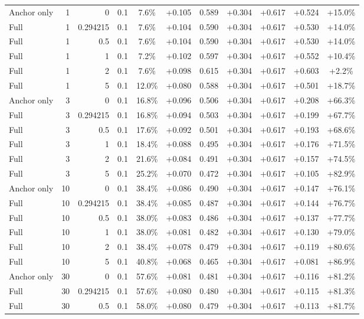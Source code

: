\begin{table}[htbp]
\begin{tabular}{lrrrccccccc}
Anchor only & 1 & 0 & 0.1 & 7.6\% & +0.105 & 0.589 & +0.304 & +0.617 & +0.524 & +15.0\% \\
Full & 1 & 0.294215 & 0.1 & 7.6\% & +0.104 & 0.590 & +0.304 & +0.617 & +0.530 & +14.0\% \\
Full & 1 & 0.5 & 0.1 & 7.6\% & +0.104 & 0.590 & +0.304 & +0.617 & +0.530 & +14.0\% \\
Full & 1 & 1 & 0.1 & 7.2\% & +0.102 & 0.597 & +0.304 & +0.617 & +0.552 & +10.4\% \\
Full & 1 & 2 & 0.1 & 7.6\% & +0.098 & 0.615 & +0.304 & +0.617 & +0.603 & +2.2\% \\
Full & 1 & 5 & 0.1 & 12.0\% & +0.080 & 0.588 & +0.304 & +0.617 & +0.501 & +18.7\% \\
Anchor only & 3 & 0 & 0.1 & 16.8\% & +0.096 & 0.506 & +0.304 & +0.617 & +0.208 & +66.3\% \\
Full & 3 & 0.294215 & 0.1 & 16.8\% & +0.094 & 0.503 & +0.304 & +0.617 & +0.199 & +67.7\% \\
Full & 3 & 0.5 & 0.1 & 17.6\% & +0.092 & 0.501 & +0.304 & +0.617 & +0.193 & +68.6\% \\
Full & 3 & 1 & 0.1 & 18.4\% & +0.088 & 0.495 & +0.304 & +0.617 & +0.176 & +71.5\% \\
Full & 3 & 2 & 0.1 & 21.6\% & +0.084 & 0.491 & +0.304 & +0.617 & +0.157 & +74.5\% \\
Full & 3 & 5 & 0.1 & 25.2\% & +0.070 & 0.472 & +0.304 & +0.617 & +0.105 & +82.9\% \\
Anchor only & 10 & 0 & 0.1 & 38.4\% & +0.086 & 0.490 & +0.304 & +0.617 & +0.147 & +76.1\% \\
Full & 10 & 0.294215 & 0.1 & 38.4\% & +0.085 & 0.487 & +0.304 & +0.617 & +0.144 & +76.7\% \\
Full & 10 & 0.5 & 0.1 & 38.0\% & +0.083 & 0.486 & +0.304 & +0.617 & +0.137 & +77.7\% \\
Full & 10 & 1 & 0.1 & 38.0\% & +0.081 & 0.482 & +0.304 & +0.617 & +0.130 & +79.0\% \\
Full & 10 & 2 & 0.1 & 38.4\% & +0.078 & 0.479 & +0.304 & +0.617 & +0.119 & +80.6\% \\
Full & 10 & 5 & 0.1 & 40.8\% & +0.068 & 0.465 & +0.304 & +0.617 & +0.081 & +86.9\% \\
Anchor only & 30 & 0 & 0.1 & 57.6\% & +0.081 & 0.481 & +0.304 & +0.617 & +0.116 & +81.2\% \\
Full & 30 & 0.294215 & 0.1 & 57.6\% & +0.080 & 0.480 & +0.304 & +0.617 & +0.115 & +81.3\% \\
Full & 30 & 0.5 & 0.1 & 58.0\% & +0.080 & 0.479 & +0.304 & +0.617 & +0.113 & +81.7\% \\

\end{tabular}
\end{table}
